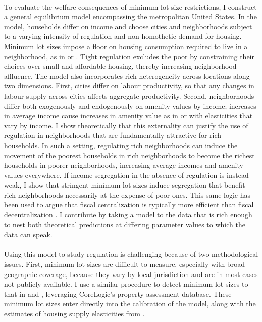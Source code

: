 \documentclass[12pt]{article}
\begin{document}
	\paragraph*{}
	To evaluate the welfare consequences of minimum lot size restrictions, I construct a general equilibrium model encompassing the metropolitan United States. In the model, households differ on income and choose cities and neighborhoods subject to a varying intensity of regulation and non-homothetic demand for housing. Minimum lot sizes impose a floor on housing consumption required to live in a neighborhood, as in \cite{kulka} or \cite{calabresetal}. Tight regulation excludes the poor by constraining their choices over small and affordable housing, thereby increasing neighborhood affluence. The model also incorporates rich heterogeneity across locations along two dimensions. First, cities differ on labour productivity, so that any changes in labour supply across cities affects aggregate productivity. Second, neighborhoods differ both exogenously and endogenously on amenity values by income; increases in average income cause increases in amenity value as in \citet{parispoor} or \citet{ghh2013} with elasticities that vary by income. I show theoretically that this externality can justify the use of regulation in neighborhoods that are fundamentally attractive for rich households. In such a setting, regulating rich neighborhoods can induce the movement of the poorest households in rich neighborhoods to become the richest households in poorer neighborhoods, increasing average incomes and amenity values everywhere. If income segregation in the absence of regulation is instead weak, I show that stringent minimum lot sizes induce segregation that benefit rich neighborhoods necessarily at the expense of poor ones. This same logic has been used to argue that fiscal centralization is typically more efficient than fiscal decentralization \citep{ineffTiebout}. I contribute by taking a model to the data that is rich enough to nest both theoretical predictions at differing parameter values to which the data can speak.
	
	\paragraph*{}
	Using this model to study regulation is challenging because of two methodological issues. First, minimum lot sizes are difficult to measure, especially with broad geographic coverage, because they vary by local jurisdiction and are in most cases not publicly available. I use a similar procedure to detect minimum lot sizes to that in \cite{Song} and \cite{Cui}, leveraging CoreLogic's property assessment database. These minimum lot sizes enter directly into the calibration of the model, along with the estimates of housing supply elasticities from \cite{BSH}. 
	 
\end{document}
